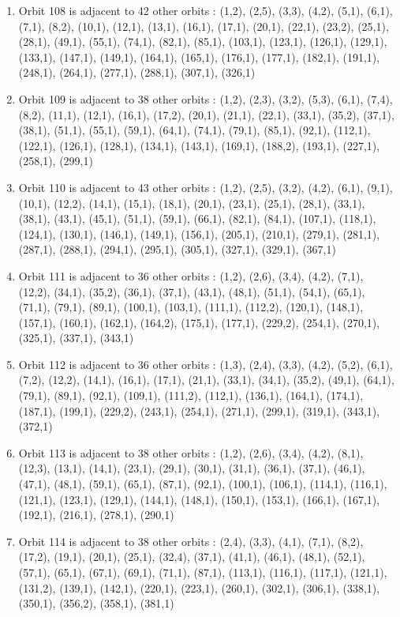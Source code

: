 \documentclass[12pt]{article}
\begin{document}
\begin{enumerate}
\item Orbit 108 is adjacent to 42 other orbits : (1,2), (2,5), (3,3), (4,2), (5,1), (6,1), (7,1), (8,2), (10,1), (12,1), (13,1), (16,1), (17,1), (20,1), (22,1), (23,2), (25,1), (28,1), (49,1), (55,1), (74,1), (82,1), (85,1), (103,1), (123,1), (126,1), (129,1), (133,1), (147,1), (149,1), (164,1), (165,1), (176,1), (177,1), (182,1), (191,1), (248,1), (264,1), (277,1), (288,1), (307,1), (326,1)
\item Orbit 109 is adjacent to 38 other orbits : (1,2), (2,3), (3,2), (5,3), (6,1), (7,4), (8,2), (11,1), (12,1), (16,1), (17,2), (20,1), (21,1), (22,1), (33,1), (35,2), (37,1), (38,1), (51,1), (55,1), (59,1), (64,1), (74,1), (79,1), (85,1), (92,1), (112,1), (122,1), (126,1), (128,1), (134,1), (143,1), (169,1), (188,2), (193,1), (227,1), (258,1), (299,1)
\item Orbit 110 is adjacent to 43 other orbits : (1,2), (2,5), (3,2), (4,2), (6,1), (9,1), (10,1), (12,2), (14,1), (15,1), (18,1), (20,1), (23,1), (25,1), (28,1), (33,1), (38,1), (43,1), (45,1), (51,1), (59,1), (66,1), (82,1), (84,1), (107,1), (118,1), (124,1), (130,1), (146,1), (149,1), (156,1), (205,1), (210,1), (279,1), (281,1), (287,1), (288,1), (294,1), (295,1), (305,1), (327,1), (329,1), (367,1)
\item Orbit 111 is adjacent to 36 other orbits : (1,2), (2,6), (3,4), (4,2), (7,1), (12,2), (34,1), (35,2), (36,1), (37,1), (43,1), (48,1), (51,1), (54,1), (65,1), (71,1), (79,1), (89,1), (100,1), (103,1), (111,1), (112,2), (120,1), (148,1), (157,1), (160,1), (162,1), (164,2), (175,1), (177,1), (229,2), (254,1), (270,1), (325,1), (337,1), (343,1)
\item Orbit 112 is adjacent to 36 other orbits : (1,3), (2,4), (3,3), (4,2), (5,2), (6,1), (7,2), (12,2), (14,1), (16,1), (17,1), (21,1), (33,1), (34,1), (35,2), (49,1), (64,1), (79,1), (89,1), (92,1), (109,1), (111,2), (112,1), (136,1), (164,1), (174,1), (187,1), (199,1), (229,2), (243,1), (254,1), (271,1), (299,1), (319,1), (343,1), (372,1)
\item Orbit 113 is adjacent to 38 other orbits : (1,2), (2,6), (3,4), (4,2), (8,1), (12,3), (13,1), (14,1), (23,1), (29,1), (30,1), (31,1), (36,1), (37,1), (46,1), (47,1), (48,1), (59,1), (65,1), (87,1), (92,1), (100,1), (106,1), (114,1), (116,1), (121,1), (123,1), (129,1), (144,1), (148,1), (150,1), (153,1), (166,1), (167,1), (192,1), (216,1), (278,1), (290,1)
\item Orbit 114 is adjacent to 38 other orbits : (2,4), (3,3), (4,1), (7,1), (8,2), (17,2), (19,1), (20,1), (25,1), (32,4), (37,1), (41,1), (46,1), (48,1), (52,1), (57,1), (65,1), (67,1), (69,1), (71,1), (87,1), (113,1), (116,1), (117,1), (121,1), (131,2), (139,1), (142,1), (220,1), (223,1), (260,1), (302,1), (306,1), (338,1), (350,1), (356,2), (358,1), (381,1)

\end{enumerate}
\end{document}
